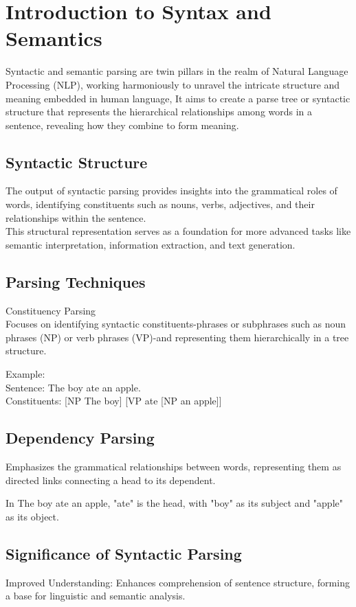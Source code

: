 \documentclass[10pt]{article}
\begin{document}
\section*{Introduction to Syntax and Semantics}
Syntactic and semantic parsing are twin pillars in the realm of Natural Language Processing (NLP), working harmoniously to unravel the intricate structure and meaning embedded in human language, It aims to create a parse tree or syntactic structure that represents the hierarchical relationships among words in a sentence, revealing how they combine to form meaning.

\subsection*{Syntactic Structure}
The output of syntactic parsing provides insights into the grammatical roles of words, identifying constituents such as nouns, verbs, adjectives, and their relationships within the sentence.\\
This structural representation serves as a foundation for more advanced tasks like semantic interpretation, information extraction, and text generation.

\subsection*{Parsing Techniques}
Constituency Parsing\\
Focuses on identifying syntactic constituents-phrases or subphrases such as noun phrases (NP) or verb phrases (VP)-and representing them hierarchically in a tree structure.

Example:\\
Sentence: The boy ate an apple.\\[0pt]
Constituents: [NP The boy] [VP ate [NP an apple]]

\subsection*{Dependency Parsing}
Emphasizes the grammatical relationships between words, representing them as\\
directed links connecting a head to its dependent.

\begin{example}
	In The boy ate an apple, "ate" is the head, with "boy" as its subject and "apple" as its object.
\end{example}

\subsection*{Significance of Syntactic Parsing}
Improved Understanding: Enhances comprehension of sentence structure, forming a base for linguistic and semantic analysis.
\end{document}
